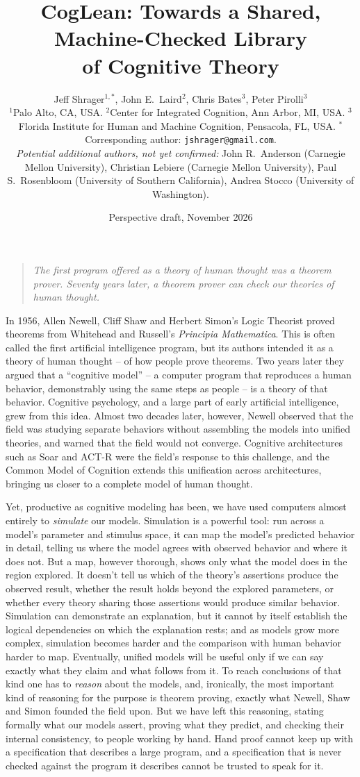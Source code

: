 \documentclass[11pt]{article}
\title{CogLean: Towards a Shared, Machine-Checked Library\\ of Cognitive Theory}
\author{\parbox{0.95\linewidth}{\centering
Jeff Shrager$^{1,*}$, John E.\ Laird$^{2}$,
Chris Bates$^{3}$, Peter Pirolli$^{3}$
\\[1ex]
\small
$^{1}$Palo Alto, CA, USA.
$^{2}$Center for Integrated Cognition, Ann Arbor, MI, USA.
$^{3}$Florida Institute for Human and Machine Cognition, Pensacola, FL, USA.
$^{*}$Corresponding author: \texttt{jshrager@gmail.com}.
\\[1ex]
\emph{Potential additional authors, not yet confirmed:}
John R.\ Anderson (Carnegie Mellon University),
Christian Lebiere (Carnegie Mellon University),
Paul S.\ Rosenbloom (University of Southern California),
Andrea Stocco (University of Washington).}}
\date{Perspective draft, November 2026}
\begin{document}
\maketitle

\begin{quote}
\itshape The first program offered as a theory of human thought was a
theorem prover. Seventy years later, a theorem prover can check
our theories of human thought.
\end{quote}

\noindent In 1956, Allen Newell, Cliff Shaw and Herbert
Simon's Logic Theorist proved theorems from Whitehead and Russell's
\emph{Principia Mathematica}\cite{newell1956}. This is often called the
first artificial intelligence program, but its authors intended it as
a theory of human thought -- of how people prove theorems. Two years
later they argued that a ``cognitive model'' -- a computer program that
reproduces a human behavior, demonstrably using the same steps as
people -- is a theory of that behavior\cite{newell1958}. Cognitive
psychology, and a large part of early artificial intelligence, grew
from this idea. Almost two decades later, however, Newell observed that
the field was studying separate behaviors without assembling the models
into unified theories, and warned that the field would not
converge\cite{newell1973}. Cognitive architectures such as
Soar\cite{laird1987} and ACT-R\cite{anderson2007} were the field's
response to this challenge, and the Common Model of
Cognition\cite{laird2017} extends this unification across
architectures, bringing us closer to a complete model of human thought.

Yet, productive as cognitive modeling has been, we have used computers
almost entirely to \emph{simulate} our models. Simulation is a powerful
tool: run across a model's parameter and stimulus space, it can map the
model's predicted behavior in detail, telling us where the model agrees
with observed behavior and where it does not. But a map, however
thorough, shows only what the model does in the region explored. It
doesn't tell us which of the theory's assertions produce the observed
result, whether the result holds beyond the explored parameters, or
whether every theory sharing those assertions would produce similar
behavior. Simulation can demonstrate an explanation, but it cannot by
itself establish the logical dependencies on which the explanation
rests; and as models grow more complex, simulation becomes harder and the comparison with human
behavior harder to map. Eventually, unified models will be useful only
if we can say exactly what they claim and what follows from it. To
reach conclusions of that kind one has to \emph{reason} about the
models, and, ironically, the most important kind of reasoning for the
purpose is theorem proving, exactly what Newell, Shaw and Simon founded
the field upon. But we have left this reasoning, stating formally what
our models assert, proving what they predict, and checking their
internal consistency, to people working by hand. Hand proof cannot keep
up with a specification that describes a large program, and a
specification that is never checked against the program it describes
cannot be trusted to speak for it.
\end{document}
